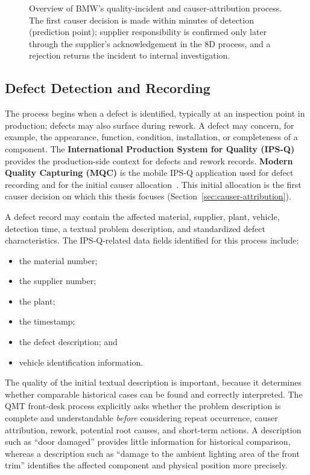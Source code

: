 \begin{figure}[tbp]
\begin{tikzpicture}
\end{tikzpicture}
\caption{Overview of BMW's quality-incident and
  causer-attribution process. The first causer decision is made within
  minutes of detection (prediction point); supplier responsibility is
  confirmed only later through the supplier's acknowledgement in the 8D
  process, and a rejection returns the incident to internal investigation.}
\label{fig:bmw_process_overview}
\end{figure}

\subsection{Defect Detection and Recording}\label{sec:fund_bmw_detection}

The process begins when a defect is identified, typically at an inspection
point in production; defects may also surface during rework. A defect may
concern, for example, the appearance, function, condition, installation,
or completeness of a component. The \textbf{International Production
System for Quality (IPS-Q)} provides the production-side context for
defects and rework records. \textbf{Modern Quality Capturing (MQC)} is the
mobile IPS-Q application used for defect recording and for the initial
causer allocation~\cite{bmwint_mqc}. This initial allocation is the first
causer decision on which this thesis focuses
(Section~\ref{sec:causer-attribution}).

A defect record may contain the affected material, supplier, plant,
vehicle, detection time, a textual problem description, and standardized
defect characteristics. The IPS-Q-related data fields identified for this
process include:

\begin{itemize}
  \item the material number;
  \item the supplier number;
  \item the plant;
  \item the timestamp;
  \item the defect description; and
  \item vehicle identification information.
\end{itemize}

The quality of the initial textual description is important, because it
determines whether comparable historical cases can be found and correctly
interpreted. The QMT front-desk process explicitly asks whether the
problem description is complete and understandable \emph{before}
considering repeat occurrence, causer attribution, rework, potential root
causes, and short-term actions. A description such as ``door damaged''
provides little information for historical comparison, whereas a
description such as ``damage to the ambient lighting area of the front
trim'' identifies the affected component and physical position more
precisely.

